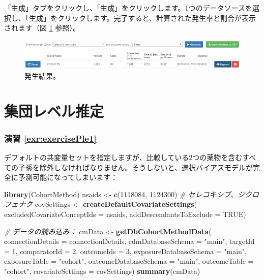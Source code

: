 \documentclass[
  11pt]{book}
\newenvironment{Shaded}{\begin{snugshade}}{\end{snugshade}}
\newcommand{\AttributeTok}[1]{\textcolor[rgb]{0.13,0.29,0.53}{#1}}
\newcommand{\CommentTok}[1]{\textcolor[rgb]{0.56,0.35,0.01}{\textit{#1}}}
\newcommand{\ConstantTok}[1]{\textcolor[rgb]{0.56,0.35,0.01}{#1}}
\newcommand{\DecValTok}[1]{\textcolor[rgb]{0.00,0.00,0.81}{#1}}
\newcommand{\FunctionTok}[1]{\textcolor[rgb]{0.13,0.29,0.53}{\textbf{#1}}}
\newcommand{\NormalTok}[1]{#1}
\newcommand{\OtherTok}[1]{\textcolor[rgb]{0.56,0.35,0.01}{#1}}
\newcommand{\StringTok}[1]{\textcolor[rgb]{0.31,0.60,0.02}{#1}}
\theoremstyle{definition}
\theoremstyle{definition}
\theoremstyle{definition}
\theoremstyle{definition}
\theoremstyle{remark}
\begin{document}
「生成」タブをクリックし、「生成」をクリックします。1つのデータソースを選択し、「生成」をクリックします。完了すると、計算された発生率と割合が表示されます（図 \ref{fig:irResults} 参照）。

\begin{figure}

{\centering \includegraphics[width=1\linewidth]{images/SuggestedAnswers/irResults} 

}

\caption{発生結果。}\label{fig:irResults}
\end{figure}

\section{集団レベル推定}\label{Pleanswers}

\subsubsection*{演習 \ref{exr:exercisePle1}}\label{ux6f14ux7fd2-refexrexerciseple1}

デフォルトの共変量セットを指定しますが、比較している2つの薬物を含むすべての子孫を除外しなければなりません。そうしないと、選択バイアスモデルが完全に予測可能になってしまいます：

\begin{Shaded}
\begin{Highlighting}[]
\FunctionTok{library}\NormalTok{(CohortMethod)}
\NormalTok{nsaids }\OtherTok{\textless{}{-}} \FunctionTok{c}\NormalTok{(}\DecValTok{1118084}\NormalTok{, }\DecValTok{1124300}\NormalTok{) }\CommentTok{\# セレコキシブ、ジクロフェナク}
\NormalTok{covSettings }\OtherTok{\textless{}{-}} \FunctionTok{createDefaultCovariateSettings}\NormalTok{(}
  \AttributeTok{excludedCovariateConceptIds =}\NormalTok{ nsaids,}
  \AttributeTok{addDescendantsToExclude =} \ConstantTok{TRUE}\NormalTok{)}

\CommentTok{\# データの読み込み：}
\NormalTok{cmData }\OtherTok{\textless{}{-}} \FunctionTok{getDbCohortMethodData}\NormalTok{(}
  \AttributeTok{connectionDetails =}\NormalTok{ connectionDetails,}
  \AttributeTok{cdmDatabaseSchema =} \StringTok{"main"}\NormalTok{,}
  \AttributeTok{targetId =} \DecValTok{1}\NormalTok{,}
  \AttributeTok{comparatorId =} \DecValTok{2}\NormalTok{,}
  \AttributeTok{outcomeIds =} \DecValTok{3}\NormalTok{,}
  \AttributeTok{exposureDatabaseSchema =} \StringTok{"main"}\NormalTok{,}
  \AttributeTok{exposureTable =} \StringTok{"cohort"}\NormalTok{,}
  \AttributeTok{outcomeDatabaseSchema =} \StringTok{"main"}\NormalTok{,}
  \AttributeTok{outcomeTable =} \StringTok{"cohort"}\NormalTok{,}
  \AttributeTok{covariateSettings =}\NormalTok{ covSettings)}
\FunctionTok{summary}\NormalTok{(cmData)}
\end{Highlighting}
\end{Shaded}
\end{document}
